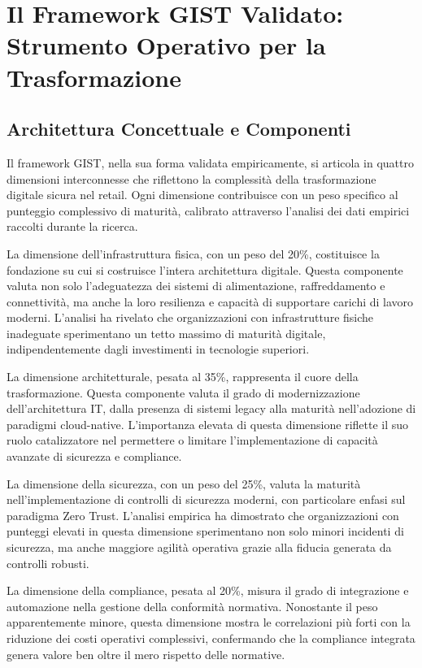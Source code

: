 \section{Il Framework GIST Validato: Strumento Operativo per la Trasformazione}

\subsection{Architettura Concettuale e Componenti}

Il framework GIST, nella sua forma validata empiricamente, si articola in quattro dimensioni interconnesse che riflettono la complessità della trasformazione digitale sicura nel retail. Ogni dimensione contribuisce con un peso specifico al punteggio complessivo di maturità, calibrato attraverso l'analisi dei dati empirici raccolti durante la ricerca.

La dimensione dell'infrastruttura fisica, con un peso del 20\%, costituisce la fondazione su cui si costruisce l'intera architettura digitale. Questa componente valuta non solo l'adeguatezza dei sistemi di alimentazione, raffreddamento e connettività, ma anche la loro resilienza e capacità di supportare carichi di lavoro moderni. L'analisi ha rivelato che organizzazioni con infrastrutture fisiche inadeguate sperimentano un tetto massimo di maturità digitale, indipendentemente dagli investimenti in tecnologie superiori.

La dimensione architetturale, pesata al 35\%, rappresenta il cuore della trasformazione. Questa componente valuta il grado di modernizzazione dell'architettura IT, dalla presenza di sistemi legacy alla maturità nell'adozione di paradigmi cloud-native. L'importanza elevata di questa dimensione riflette il suo ruolo catalizzatore nel permettere o limitare l'implementazione di capacità avanzate di sicurezza e compliance.

La dimensione della sicurezza, con un peso del 25\%, valuta la maturità nell'implementazione di controlli di sicurezza moderni, con particolare enfasi sul paradigma Zero Trust. L'analisi empirica ha dimostrato che organizzazioni con punteggi elevati in questa dimensione sperimentano non solo minori incidenti di sicurezza, ma anche maggiore agilità operativa grazie alla fiducia generata da controlli robusti.

La dimensione della compliance, pesata al 20\%, misura il grado di integrazione e automazione nella gestione della conformità normativa. Nonostante il peso apparentemente minore, questa dimensione mostra le correlazioni più forti con la riduzione dei costi operativi complessivi, confermando che la compliance integrata genera valore ben oltre il mero rispetto delle normative.

